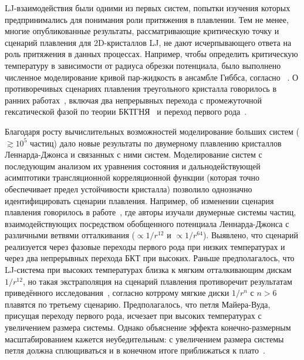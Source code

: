 LJ-взаимодействия были одними из первых систем, попытки изучения которых предпринимались для понимания роли притяжения в плавлении. 
Тем не менее, многие опубликованные результаты, рассматривающие критическую точку и сценарий плавления для 2D-кристаллов LJ, не дают исчерпывающего ответа на роль притяжения в данных процессах.
Например, чтобы определить критическую температуру в зависимости от радиуса обрезки потенциала, было выполнено численное моделирование кривой пар-жидкость в ансамбле Гиббса, согласно ~\cite{10.1063/1.460477}.
О противоречивых сценариях плавления треугольного кристалла говорилось в ранних работах~\cite{10.1103/physrevlett.42.1632, 10.1063/1.436526, 10.1103/physrevlett.44.463, 10.1063/1.441901, 10.1103/physrevlett.52.449, 10.1103/physrevb.30.2755}, включая два непрерывных перехода с промежуточной гексатической фазой по теории БКТГНЯ~\cite{10.1103/physrevlett.42.1632} и переход первого рода~\cite{10.1063/1.436526, 10.1103/physrevlett.44.463, 10.1063/1.441901, 10.1103/physrevlett.52.449}.

Благодаря росту вычислительных возможностей моделирование больших систем ($\gtrsim 10^5$ частиц) дало новые результаты по двумерному плавлению кристаллов Леннарда-Джонса и связанных с ними систем.
Моделирование систем с последующим анализом их уравнения состояния и дальнодействующей асимптотики трансляционной корреляционной функции (которая точно обеспечивает предел устойчивости кристалла) позволило однозначно идентифицировать сценарии плавления. 
Например, об изменении сценария плавления говорилось в работе~\cite{10.1103/physreve.99.022145}, где авторы изучали двумерные системы частиц, взаимодействующих посредством обобщенного потенциала Леннарда-Джонса с различными ветвями отталкивания ($\propto 1/r ^{12}$ и $\propto 1/r^{64}$).
Выявлено, что сценарий реализуется через фазовые переходы первого рода при низких температурах и через два непрерывных перехода БКТ при высоких.
Раньше предполагалось, что LJ-система при высоких температурах близка к мягким отталкивающим дискам $1/r^{12}$, но такая экстраполяция на сценарий плавления противоречит результатам приведённого исследования~\cite{10.1103/physrevlett.114.035702}, согласно котррому мягкие диски $1/r^n$ с $n>6$ плавятся по третьему сценарию. 
Предполагалось, что петля Майера-Вуда, присущая переходу первого рода, исчезает при высоких температурах с увеличением размера системы. 
Однако объяснение эффекта конечно-размерным масштабированием кажется неубедительным: с увеличением размера системы петля должна сплющиваться и в конечном итоге приближаться к плато~\cite{10.1103/physreve.87.042134, 10.1103/physreve.59.2659}.

